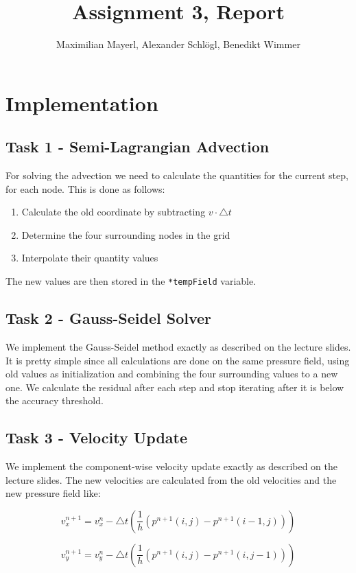 \documentclass[11pt]{article}
\author{Maximilian Mayerl, Alexander Schl\"ogl, Benedikt Wimmer}
\title{Assignment 3, Report}
\begin{document}
\maketitle



    
\section{Implementation}\label{implementation}



\subsection{Task 1 - Semi-Lagrangian Advection}\label{forward-euler}

For solving the advection we need to calculate the quantities for the current step, for each node. This is done as follows:

\begin{enumerate}
	\item Calculate the old coordinate by subtracting $v\cdot \triangle t$
	\item Determine the four surrounding nodes in the grid
	\item Interpolate their quantity values
\end{enumerate}

\noindent The new values are then stored in the \texttt{*tempField} variable.

\subsection{Task 2 - Gauss-Seidel Solver}

We implement the Gauss-Seidel method exactly as described on the lecture slides. It is pretty simple since all calculations are done on the same pressure field, using old values as initialization and combining the four surrounding values to a new one. We calculate the residual after each step and stop iterating after it is below the accuracy threshold.



\subsection{Task 3 - Velocity Update}

We implement the component-wise velocity update exactly as described on the lecture slides. The new velocities are calculated from the old velocities and the new pressure field like:

$$v^{n+1}_{x} = v^{n}_{x} -\triangle t(\frac{1}{h}(p^{n+1}(i,j) - p^{n+1}(i-1,j)))$$

$$v^{n+1}_{y} = v^{n}_{y} -\triangle t(\frac{1}{h}(p^{n+1}(i,j) - p^{n+1}(i,j-1)))$$

    
    
\end{document}
